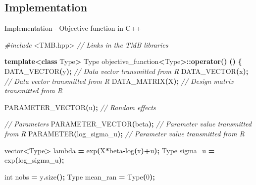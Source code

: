 \documentclass[aspectratio=169]{beamer}
\newenvironment{Shaded}{\begin{snugshade}}{\end{snugshade}}
\newcommand{\CommentTok}[1]{\textcolor[rgb]{0.56,0.35,0.01}{\textit{#1}}}
\newcommand{\DataTypeTok}[1]{\textcolor[rgb]{0.13,0.29,0.53}{#1}}
\newcommand{\DecValTok}[1]{\textcolor[rgb]{0.00,0.00,0.81}{#1}}
\newcommand{\ImportTok}[1]{#1}
\newcommand{\KeywordTok}[1]{\textcolor[rgb]{0.13,0.29,0.53}{\textbf{#1}}}
\newcommand{\NormalTok}[1]{#1}
\newcommand{\OperatorTok}[1]{\textcolor[rgb]{0.81,0.36,0.00}{\textbf{#1}}}
\newcommand{\PreprocessorTok}[1]{\textcolor[rgb]{0.56,0.35,0.01}{\textit{#1}}}
\begin{document}
\hypertarget{implementation}{%
\subsection{Implementation}\label{implementation}}

\begin{frame}[fragile]{Implementation - Objective function in C++}
\protect\hypertarget{implementation---objective-function-in-c}{}
\tiny

\begin{Shaded}
\begin{Highlighting}[]
\PreprocessorTok{\#include }\ImportTok{\textless{}TMB.hpp\textgreater{}}\PreprocessorTok{              }\CommentTok{// Links in the TMB libraries}

\KeywordTok{template}\OperatorTok{\textless{}}\KeywordTok{class}\NormalTok{ Type}\OperatorTok{\textgreater{}}
\NormalTok{Type objective\_function}\OperatorTok{\textless{}}\NormalTok{Type}\OperatorTok{\textgreater{}::}\KeywordTok{operator}\OperatorTok{()} \OperatorTok{()}
\OperatorTok{\{}
\NormalTok{  DATA\_VECTOR}\OperatorTok{(}\NormalTok{y}\OperatorTok{);}                               \CommentTok{// Data vector transmitted from R}
\NormalTok{  DATA\_VECTOR}\OperatorTok{(}\NormalTok{x}\OperatorTok{);}                       \CommentTok{// Data vector transmitted from R}
\NormalTok{  DATA\_MATRIX}\OperatorTok{(}\NormalTok{X}\OperatorTok{);}                       \CommentTok{// Design matrix transmitted from R}
  
\NormalTok{  PARAMETER\_VECTOR}\OperatorTok{(}\NormalTok{u}\OperatorTok{);}                      \CommentTok{// Random effects}
  
  \CommentTok{// Parameters}
\NormalTok{  PARAMETER\_VECTOR}\OperatorTok{(}\NormalTok{beta}\OperatorTok{);}         \CommentTok{// Parameter value transmitted from R}
\NormalTok{  PARAMETER}\OperatorTok{(}\NormalTok{log\_sigma\_u}\OperatorTok{);}               \CommentTok{// Parameter value transmitted from R}
  
\NormalTok{  vector}\OperatorTok{\textless{}}\NormalTok{Type}\OperatorTok{\textgreater{}}\NormalTok{ lambda  }\OperatorTok{=}\NormalTok{ exp}\OperatorTok{(}\NormalTok{X}\OperatorTok{*}\NormalTok{beta}\OperatorTok{{-}}\NormalTok{log}\OperatorTok{(}\NormalTok{x}\OperatorTok{)+}\NormalTok{u}\OperatorTok{);}
\NormalTok{  Type sigma\_u }\OperatorTok{=}\NormalTok{ exp}\OperatorTok{(}\NormalTok{log\_sigma\_u}\OperatorTok{);}
  
  \DataTypeTok{int}\NormalTok{ nobs }\OperatorTok{=}\NormalTok{ y}\OperatorTok{.}\NormalTok{size}\OperatorTok{();}
\NormalTok{  Type mean\_ran }\OperatorTok{=}\NormalTok{ Type}\OperatorTok{(}\DecValTok{0}\OperatorTok{);}
  

\end{Highlighting}
\end{Shaded}
\end{frame}
\end{document}

